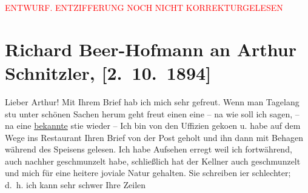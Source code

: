 
\begin{center}
            \textcolor{red}{ENTWURF. ENTZIFFERUNG NOCH NICHT KORREKTURGELESEN}
                      \end{center}
            
               \section[Richard Beer-Hofmann an Arthur Schnitzler, {[}2. 10. 1894{]}]{ Richard Beer-Hofmann an Arthur Schnitzler, {[}2. 10. 1894{]}}\nopagebreak{}\rehead{ }\begin{ledgroupsized}[t]{13cm}\normalsize\beginnumbering{} \toendnotes[C]{\smallbreak\pagebreak[2]} 
\toendnotes[C]{\smallbreak}\pstart
           \noindent{}{\pb}Lieber Arthur! Mit Ihrem Brief hab ich mich sehr gefreut. Wenn
                    man Tagelang stu{\geminationm} unter schönen Sachen herum geht
                    freut einen eine – na wie soll ich sagen, – na eine \uline{bekannte} sti{\geminationm}e wieder –\pend
           \pstart
           Ich bin von den Uffizien geko{\geminationm}en u. habe auf dem Wege ins Restaurant {\pb}Ihren Brief von der Post
                    geholt und ihn dann mit Behagen während des Speisens gelesen. Ich habe Aufsehen
                    erregt weil ich fortwährend, auch nachher geschmunzelt habe, schließlich hat der
                    Kellner auch geschmunzelt und mich für eine heitere joviale Natur gehalten.\pend
           \pstart
           Sie schreiben i{\geminationm}er schlechter; d. h. ich kann sehr
                    schwer {\pb}Ihre Zeilen

\end{ledgroupsized}
